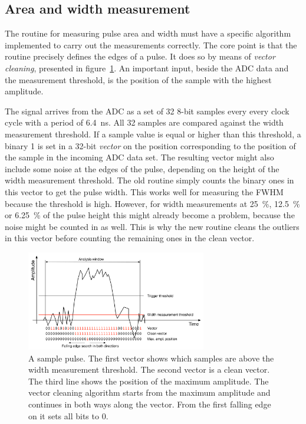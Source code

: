 \subsection{Area and width measurement}
\label{sec:vecclean}
The routine for measuring pulse area and width must have a specific algorithm implemented to carry out the measurements correctly. The core point is that the routine precisely defines the edges of a pulse. It does so by means of \emph{vector cleaning}, presented in figure~\ref{fig:samplepulse}. An important input, beside the ADC data and the measurement threshold, is the position of the sample with the highest amplitude. 

The signal arrives from the ADC as a set of 32 8-bit samples every every clock cycle with a period of 6.4~ns. All 32 samples are compared against the width measurement threshold. If a sample value is equal or higher than this threshold, a binary 1 is set in a 32-bit \emph{vector} on the position corresponding to the position of the sample in the incoming ADC data set. The resulting vector might also include some noise at the edges of the pulse, depending on the height of the width measurement threshold. The old routine simply counts the binary ones in this vector to get the pulse width. This works well for measuring the FWHM because the threshold is high. However, for width measurements at 25~\%, 12.5~\% or 6.25~\% of the pulse height this might already become a problem, because the noise might be counted in as well. This is why the new routine cleans the outliers in this vector before counting the remaining ones in the clean vector. 

\begin{figure}[!t]
\centering
\includegraphics[width=0.7\textwidth]{05_current_monitoring/plots/pulse1}
\caption{A sample pulse. The first vector shows which samples are above the width measurement threshold. The second vector is a clean vector. The third line shows the position of the maximum amplitude. The vector cleaning algorithm starts from the maximum amplitude and continues in both ways along the vector. From the first falling edge on it sets all bits to 0.}
\label{fig:samplepulse}
\end{figure}

